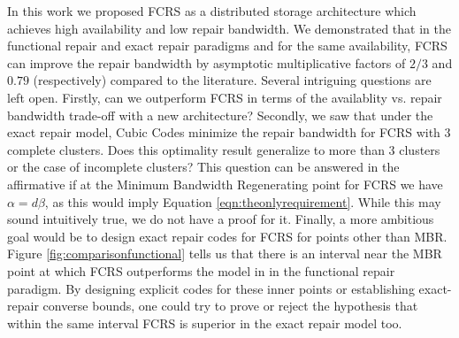 \documentclass[journal,onecolumn,draftcls]{IEEEtran}
\begin{document}
\label{sec:conclusion}
In this work we proposed FCRS as a distributed storage architecture which achieves high availability and low repair bandwidth. We demonstrated that in the functional repair and exact repair paradigms and for the same availability, FCRS can improve the repair bandwidth by asymptotic multiplicative factors of $2/3$ and $0.79$ (respectively) compared to the literature. Several intriguing questions are left open. Firstly, can we outperform FCRS in terms of the availablity vs. repair bandwidth trade-off with a new architecture? Secondly, we saw that under the exact repair model, Cubic Codes minimize the repair bandwidth for FCRS with 3 complete clusters. Does this optimality result generalize to more than 3 clusters or the case of incomplete clusters? This question can be answered in the affirmative if at the Minimum Bandwidth Regenerating point for FCRS we have $\alpha = d\beta$, as this would imply Equation \eqref{eqn:theonlyrequirement}. While this may sound intuitively true, we do not have a proof for it. Finally, a more ambitious goal would be to design exact repair codes for FCRS for points other than MBR. Figure \ref{fig:comparisonfunctional} tells us that there is an interval near the MBR point at which FCRS outperforms the model in \cite{dimakis2010network} in the functional repair paradigm. By designing explicit codes for these inner points or establishing exact-repair converse bounds, one could try to prove or reject the hypothesis that within the same interval FCRS is superior in the exact repair model too.


\end{document}
